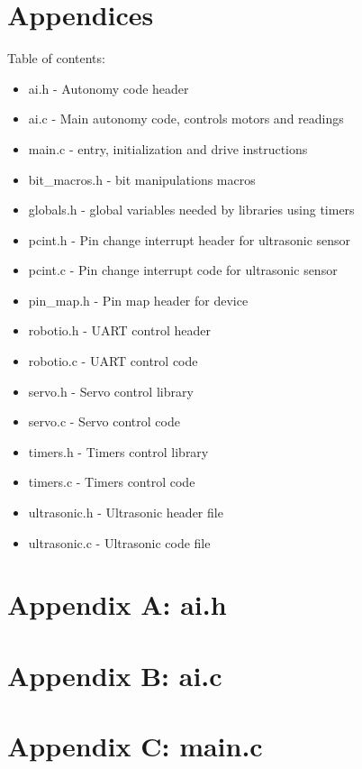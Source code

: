 \documentclass[letterpaper,11pt]{texMemo} %
\begin{document}
\section*{Appendices}
Table of contents:
\begin{itemize}
    \item ai.h - Autonomy code header
    \item ai.c - Main autonomy code, controls motors and readings
    \item main.c - entry, initialization and drive instructions
    \item bit\_macros.h - bit manipulations macros
    \item globals.h - global variables needed by libraries using timers
    \item pcint.h - Pin change interrupt header for ultrasonic sensor
    \item pcint.c - Pin change interrupt code for ultrasonic sensor
    \item pin\_map.h - Pin map header for device
    \item robotio.h - UART control header
    \item robotio.c - UART control code
    \item servo.h - Servo control library
    \item servo.c - Servo control code
    \item timers.h - Timers control library
    \item timers.c - Timers control code
    \item ultrasonic.h - Ultrasonic header file
    \item ultrasonic.c - Ultrasonic code file
\end{itemize}
\newpage

\section*{Appendix A: ai.h}
\begin{tiny}

\end{tiny}
\newpage

\section*{Appendix B: ai.c}
\begin{tiny}

\end{tiny}
\newpage

\section*{Appendix C: main.c}
\begin{tiny}

\end{tiny}
\newpage
\end{document}
